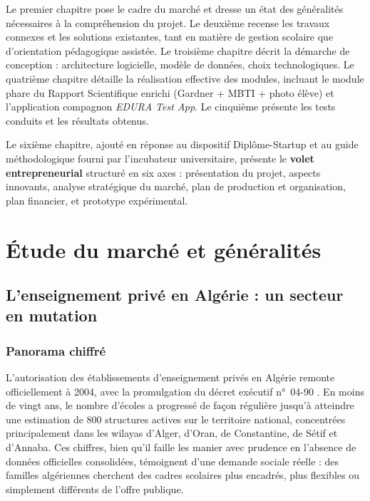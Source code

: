 \documentclass[12pt,a4paper,oneside]{report}
\begin{document}
Le premier chapitre pose le cadre du marché et dresse un état des généralités nécessaires à la compréhension du projet. Le deuxième recense les travaux connexes et les solutions existantes, tant en matière de gestion scolaire que d'orientation pédagogique assistée. Le troisième chapitre décrit la démarche de conception : architecture logicielle, modèle de données, choix technologiques. Le quatrième chapitre détaille la réalisation effective des modules, incluant le module phare du Rapport Scientifique enrichi (Gardner + MBTI + photo élève) et l'application compagnon \textit{EDURA Test App}. Le cinquième présente les tests conduits et les résultats obtenus.

Le sixième chapitre, ajouté en réponse au dispositif Diplôme-Startup et au guide méthodologique fourni par l'incubateur universitaire, présente le \textbf{volet entrepreneurial} structuré en six axes : présentation du projet, aspects innovants, analyse stratégique du marché, plan de production et organisation, plan financier, et prototype expérimental.

\chapter{Étude du marché et généralités}

\section{L'enseignement privé en Algérie : un secteur en mutation}

\subsection{Panorama chiffré}

L'autorisation des établissements d'enseignement privés en Algérie remonte officiellement à 2004, avec la promulgation du décret exécutif n°~04-90 \autocite{decret2004}. En moins de vingt ans, le nombre d'écoles a progressé de façon régulière jusqu'à atteindre une estimation de 800 structures actives sur le territoire national, concentrées principalement dans les wilayas d'Alger, d'Oran, de Constantine, de Sétif et d'Annaba. Ces chiffres, bien qu'il faille les manier avec prudence en l'absence de données officielles consolidées, témoignent d'une demande sociale réelle : des familles algériennes cherchent des cadres scolaires plus encadrés, plus flexibles ou simplement différents de l'offre publique.
\end{document}
